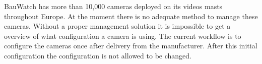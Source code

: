 




BauWatch has more than 10,000 cameras deployed on its videos masts throughout Europe. At the moment there is no adequate method to manage these cameras.
Without a proper management solution it is impossible to get a overview of what configuration a camera is using.
The current workflow is to configure the cameras once after delivery from the manufacturer.
After this initial configuration the configuration is not allowed to be changed.

